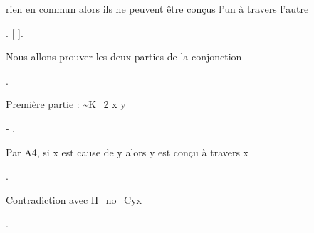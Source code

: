 \documentclass[10pt]{report}
\begin{document}
\begin{coqdoccode}
\begin{coqdoccomment}
rien\coqdocindent{0.50em}
en\coqdocindent{0.50em}
commun\coqdocindent{0.50em}
alors\coqdocindent{0.50em}
ils\coqdocindent{0.50em}
ne\coqdocindent{0.50em}
peuvent\coqdocindent{0.50em}
être\coqdocindent{0.50em}
conçus\coqdocindent{0.50em}
l'un\coqdocindent{0.50em}
à\coqdocindent{0.50em}
travers\coqdocindent{0.50em}
l'autre\coqdocindent{0.50em}
\end{coqdoccomment}
\coqdoceol
\coqdocindent{1.00em}
   .\coqdoceol
\coqdocindent{1.00em}
   [ ].\coqdoceol
\coqdocemptyline
\coqdocindent{1.00em}
\begin{coqdoccomment}
\coqdocindent{0.50em}
Nous\coqdocindent{0.50em}
allons\coqdocindent{0.50em}
prouver\coqdocindent{0.50em}
les\coqdocindent{0.50em}
deux\coqdocindent{0.50em}
parties\coqdocindent{0.50em}
de\coqdocindent{0.50em}
la\coqdocindent{0.50em}
conjonction\coqdocindent{0.50em}
\end{coqdoccomment}
\coqdoceol
\coqdocindent{1.00em}
.\coqdoceol
\coqdocemptyline
\coqdocindent{1.00em}
\begin{coqdoccomment}
\coqdocindent{0.50em}
Première\coqdocindent{0.50em}
partie\coqdocindent{0.50em}
:\coqdocindent{0.50em}
\~{}K\_2\coqdocindent{0.50em}
x\coqdocindent{0.50em}
y\coqdocindent{0.50em}
\end{coqdoccomment}
\coqdoceol
\coqdocindent{1.00em}
-  .\coqdoceol
\coqdocindent{2.00em}
\begin{coqdoccomment}
\coqdocindent{0.50em}
Par\coqdocindent{0.50em}
A4,\coqdocindent{0.50em}
si\coqdocindent{0.50em}
x\coqdocindent{0.50em}
est\coqdocindent{0.50em}
cause\coqdocindent{0.50em}
de\coqdocindent{0.50em}
y\coqdocindent{0.50em}
alors\coqdocindent{0.50em}
y\coqdocindent{0.50em}
est\coqdocindent{0.50em}
conçu\coqdocindent{0.50em}
à\coqdocindent{0.50em}
travers\coqdocindent{0.50em}
x\coqdocindent{0.50em}
\end{coqdoccomment}
\coqdoceol
\coqdocindent{2.00em}
   .\coqdoceol
\coqdocindent{2.00em}
\begin{coqdoccomment}
\coqdocindent{0.50em}
Contradiction\coqdocindent{0.50em}
avec\coqdocindent{0.50em}
H\_no\_Cyx\coqdocindent{0.50em}
\end{coqdoccomment}
\coqdoceol
\coqdocindent{2.00em}
.\coqdoceol

\end{coqdoccode}
\end{document}
